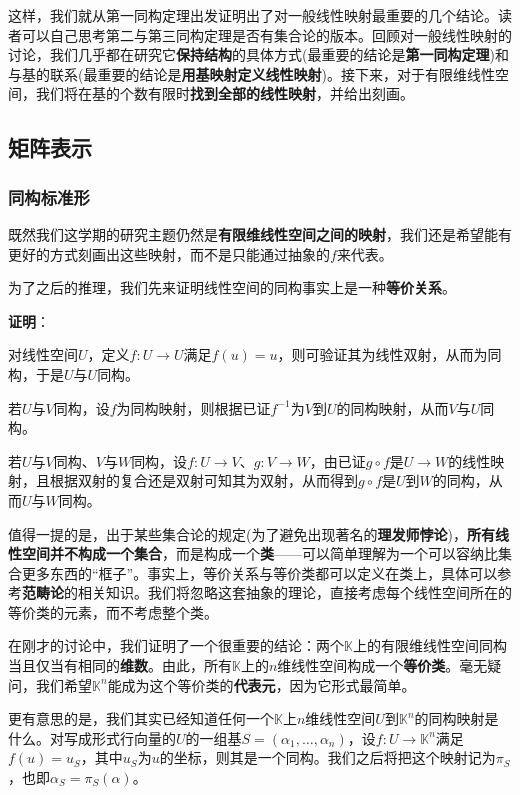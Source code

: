 \documentclass[a4paper,UTF8,fontset=windows,AutoFakeBold]{ctexart}
\newcommand*{\note}{\noindent *}
\newcommand{\proo}[1]{{\vspace{5pt}\kaishu\noindent\textbf{证明}：\vspace{-3pt}
\begin{compactitem}
    \item[] #1
\end{compactitem}
}}
\begin{document}
这样，我们就从第一同构定理出发证明出了对一般线性映射最重要的几个结论。读者可以自己思考第二与第三同构定理是否有集合论的版本。回顾对一般线性映射的讨论，我们几乎都在研究它\textbf{保持结构}的具体方式(最重要的结论是\textbf{第一同构定理})和与基的联系(最重要的结论是\textbf{用基映射定义线性映射})。接下来，对于有限维线性空间，我们将在基的个数有限时\textbf{找到全部的线性映射}，并给出刻画。

\subsection{矩阵表示}
\subsubsection{同构标准形}
既然我们这学期的研究主题仍然是\textbf{有限维线性空间之间的映射}，我们还是希望能有更好的方式刻画出这些映射，而不是只能通过抽象的$f$来代表。

为了之后的推理，我们先来证明线性空间的同构事实上是一种\textbf{等价关系}。

\proo{
    对线性空间$U$，定义$f:U\to U$满足$f(u)=u$，则可验证其为线性双射，从而为同构，于是$U$与$U$同构。

    若$U$与$V$同构，设$f$为同构映射，则根据已证$f^{-1}$为$V$到$U$的同构映射，从而$V$与$U$同构。

    若$U$与$V$同构、$V$与$W$同构，设$f:U\to V$、$g:V\to W$，由已证$g\circ f$是$U\to W$的线性映射，且根据双射的复合还是双射可知其为双射，从而得到$g\circ f$是$U$到$W$的同构，从而$U$与$W$同构。
}

\note 值得一提的是，出于某些集合论的规定(为了避免出现著名的\textbf{理发师悖论})，\textbf{所有线性空间并不构成一个集合}，而是构成一个\textbf{类}——可以简单理解为一个可以容纳比集合更多东西的``框子''。事实上，等价关系与等价类都可以定义在类上，具体可以参考\textbf{范畴论}的相关知识。我们将忽略这套抽象的理论，直接考虑每个线性空间所在的等价类的元素，而不考虑整个类。

在刚才的讨论中，我们证明了一个很重要的结论：两个$\mathbb{K}$上的有限维线性空间同构当且仅当有相同的\textbf{维数}。由此，所有$\mathbb{K}$上的$n$维线性空间构成一个\textbf{等价类}。毫无疑问，我们希望$\mathbb{K}^n$能成为这个等价类的\textbf{代表元}，因为它形式最简单。

更有意思的是，我们其实已经知道任何一个$\mathbb{K}$上$n$维线性空间$U$到$\mathbb{K}^n$的同构映射是什么。对写成形式行向量的$U$的一组基$S=(\alpha_1,\dots,\alpha_n)$，设$f:U\to\mathbb{K}^n$满足$f(u)=u_S$，其中$u_S$为$u$的坐标，则其是一个同构。我们之后将把这个映射记为$\pi_S$，也即$\alpha_S=\pi_S(\alpha)$。
\end{document}
